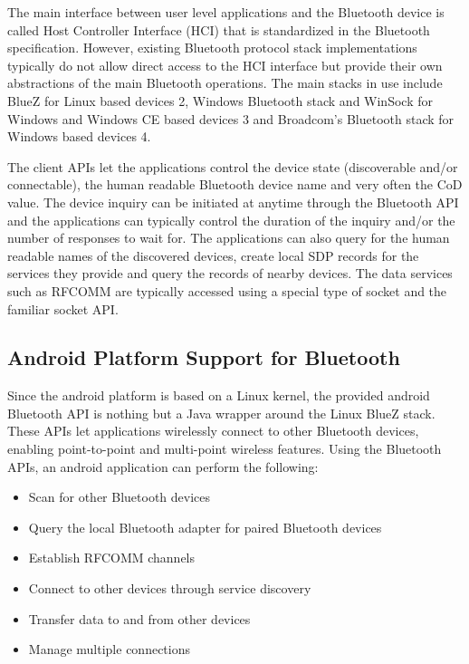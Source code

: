 The main interface between user level applications and the Bluetooth device is called Host Controller Interface (HCI) that is standardized in the Bluetooth specification. However, existing Bluetooth protocol stack implementations typically do not allow direct access to the HCI interface but provide their own abstractions of the main Bluetooth operations. The main stacks in use include BlueZ for Linux based devices 2, Windows Bluetooth stack and WinSock for Windows and Windows CE based devices 3 and Broadcom's Bluetooth stack for Windows based devices 4.

The client APIs let the applications control the device state (discoverable and/or connectable), the human readable Bluetooth device name and very often the CoD value. The device inquiry can be initiated at anytime through the Bluetooth API and the applications can typically control the duration of the inquiry and/or the number of responses to wait for. The applications can also query for the human readable names of the discovered devices, create local SDP records for the services they provide and query the records of nearby devices. The data services such as RFCOMM are typically accessed using a special type of socket and the familiar socket API.

\subsection{Android Platform Support for Bluetooth}

Since the android platform is based on a Linux kernel, the provided android Bluetooth API is nothing but a Java wrapper around the Linux BlueZ stack. These APIs let applications wirelessly connect to other Bluetooth devices, enabling point-to-point and multi-point wireless features. Using the Bluetooth APIs, an android application can perform the following:

\begin{itemize}
\item Scan for other Bluetooth devices
\item Query the local Bluetooth adapter for paired Bluetooth devices
\item Establish RFCOMM channels
\item Connect to other devices through service discovery
\item Transfer data to and from other devices
\item Manage multiple connections
\end{itemize}

